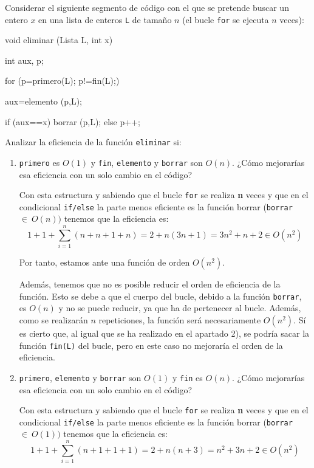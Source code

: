 \begin{ejercicio}
    Considerar el siguiente segmento de código con el que se pretende buscar un entero $x$ en una lista de enteros \verb|L| de tamaño $n$ (el bucle \verb|for| se ejecuta $n$ veces):
    \begin{listing}[H]
    \begin{cppcode}
void eliminar (Lista L, int x){
    int aux, p;
    
    for (p=primero(L); p!=fin(L);){
        aux=elemento (p,L);
        
        if (aux==x)
            borrar (p,L);
        else p++;
    }
}
    \end{cppcode}
    \end{listing}

    Analizar la eficiencia de la función \verb|eliminar| si:
    \begin{enumerate}
        \item \verb|primero| es  $O(1)$ y  \verb|fin|,  \verb|elemento| y  \verb|borrar| son  $O(n)$. ¿Cómo mejorarías esa eficiencia con un solo cambio en el código?

        Con esta estructura y sabiendo que el bucle \verb|for| se realiza \textbf{n} veces y que en el condicional \verb|if/else| la parte menos eficiente es la función borrar (\verb|borrar|~$\in~O(n))$ tenemos que la eficiencia es:
        \[
        1+1+ \sum_{i=1}^n (n+n+1+n) = 2 + n(3n+1) = 3n^2 + n + 2 \in O(n^2)
        \]
        
        Por tanto, estamos ante una función de orden $O(n^2)$.

        Además, tenemos que no es posible reducir el orden de eficiencia de la función. Esto se debe a que el cuerpo del bucle, debido a la función \verb|borrar|, es $O(n)$ y no se puede reducir, ya que ha de pertenecer al bucle. Además, como se realizarán $n$ repeticiones, la función será necesariamente $O(n^2)$. Sí es cierto que, al igual que se ha realizado en el apartado 2), se podría sacar la función \verb|fin(L)| del bucle, pero en este caso no mejoraría el orden de la eficiencia.

        \item \verb|primero|, \verb|elemento| y  \verb|borrar| son  $O(1)$ y  \verb|fin| es  $O(n)$. ¿Cómo mejorarías esa eficiencia con un solo cambio en el código?

        Con esta estructura y sabiendo que el bucle \verb|for| se realiza \textbf{n} veces y que en el condicional \verb|if/else| la parte menos eficiente es la función borrar (\verb|borrar|~$\in~O(1))$ tenemos que la eficiencia es:
        \[
        1+1+ \sum_{i=1}^n (n+1+1+1) = 2 + n(n+3) = n^2 + 3n + 2 \in O(n^2)
        \]
    

\end{enumerate}
\end{ejercicio}
